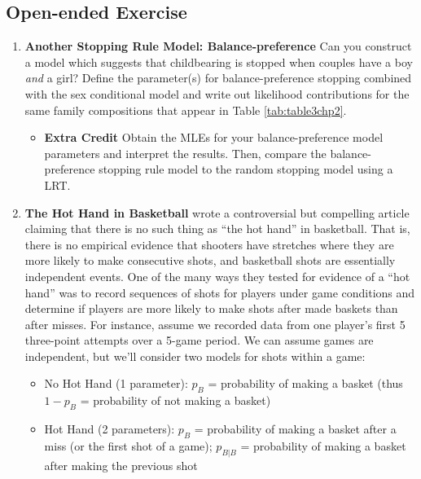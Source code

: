 \documentclass[
]{krantz}
\providecommand{\tightlist}{%
  \setlength{\itemsep}{0pt}\setlength{\parskip}{0pt}}
\begin{document}
\hypertarget{open-ended-exercise}{%
\subsection{Open-ended Exercise}\label{open-ended-exercise}}

\begin{enumerate}
\def\labelenumi{\arabic{enumi}.}
\item
  \textbf{Another Stopping Rule Model: Balance-preference}
  Can you construct a model which suggests that childbearing is stopped when couples have a boy \emph{and} a girl? Define the parameter(s) for balance-preference stopping combined with the sex conditional model and write out likelihood contributions for the same family compositions that appear in Table \ref{tab:table3chp2}.

  \begin{itemize}
  \tightlist
  \item
    \textbf{Extra Credit} Obtain the MLEs for your balance-preference model parameters and interpret the results. Then, compare the balance-preference stopping rule model to the random stopping model using a LRT.
  \end{itemize}
\item
  \textbf{The Hot Hand in Basketball} \citet{Gilovich1985} wrote a controversial but compelling article claiming that there is no such thing as ``the hot hand'' in basketball. That is, there is no empirical evidence that shooters have stretches where they are more likely to make consecutive shots, and basketball shots are essentially independent events. One of the many ways they tested for evidence of a ``hot hand'' was to record sequences of shots for players under game conditions and determine if players are more likely to make shots after made baskets than after misses. For instance, assume we recorded data from one player's first 5 three-point attempts over a 5-game period. We can assume games are independent, but we'll consider two models for shots within a game:

  \begin{itemize}
  \item
    No Hot Hand (1 parameter): \(p_B\) = probability of making a basket (thus \(1-p_B\) = probability of not making a basket)
  \item
    Hot Hand (2 parameters): \(p_B\) = probability of making a basket after a miss (or the first shot of a game); \(p_{B|B}\) = probability of making a basket after making the previous shot
  \end{itemize}


\end{enumerate}
\end{document}
